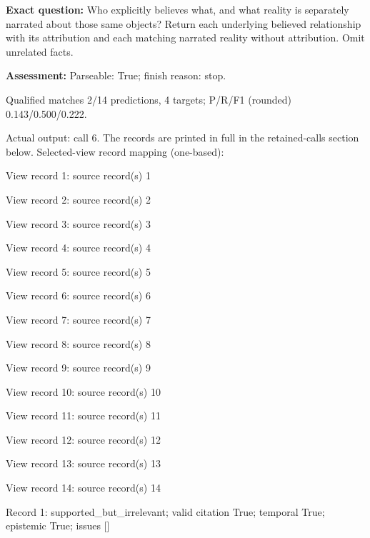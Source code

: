 \noindent\textbf{Exact question:} Who explicitly believes what, and what reality is separately narrated about those same objects? Return each underlying believed relationship with its attribution and each matching narrated reality without attribution. Omit unrelated facts.\par

\noindent\textbf{Assessment:} Parseable: True; finish reason: stop.

Qualified matches 2/14 predictions, 4 targets; P/R/F1 (rounded) 0.143/0.500/0.222.\par

Actual output: call 6. The records are printed in full in the retained-calls section below. Selected-view record mapping (one-based):

View record 1: source record(s) 1\par

View record 2: source record(s) 2\par

View record 3: source record(s) 3\par

View record 4: source record(s) 4\par

View record 5: source record(s) 5\par

View record 6: source record(s) 6\par

View record 7: source record(s) 7\par

View record 8: source record(s) 8\par

View record 9: source record(s) 9\par

View record 10: source record(s) 10\par

View record 11: source record(s) 11\par

View record 12: source record(s) 12\par

View record 13: source record(s) 13\par

View record 14: source record(s) 14\par

Record 1: supported\_but\_irrelevant; valid citation True; temporal True; epistemic True; issues []\par

